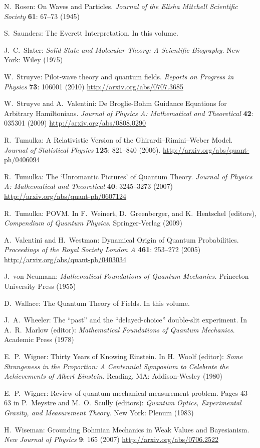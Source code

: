 \documentclass[12pt]{article}
\begin{document}
\begin{thebibliography}{20}
 N.~Rosen:
	On Waves and Particles. 
	\textit{Journal of the Elisha Mitchell Scientific Society} 
	\textbf{61}: 67--73 (1945)

 S.~Saunders: The Everett Interpretation.
	In this volume.

 J.~C.~Slater: 
	\textit{Solid-State and Molecular Theory: 
	A Scientific Biography.} 
	New York: Wiley (1975)

 W.~Struyve:  
	Pilot-wave theory and quantum fields.
	{\it Reports on Progress in Physics} {\bf 73}: 106001 (2010)
	 \url{http://arxiv.org/abs/0707.3685}

 W.~Struyve and A.~Valentini:
	De Broglie-Bohm Guidance Equations for Arbitrary Hamiltonians.
	\textit{Journal of Physics A: Mathematical and Theoretical} \textbf{42}: 035301 (2009) 
	\url{http://arxiv.org/abs/0808.0290}

 R.~Tumulka: 
	A Relativistic Version of the Ghirardi--Rimini--Weber Model. 
	\textit{Journal of Statistical Physics} 
	\textbf{125}: 821--840 (2006).
	\url{http://arxiv.org/abs/quant-ph/0406094}

 R.~Tumulka: 
	The `Unromantic Pictures' of Quantum Theory.
	\textit{Journal of Physics A: Mathematical and Theoretical} 
	\textbf{40}: 3245--3273 (2007)
	\url{http://arxiv.org/abs/quant-ph/0607124}

 R.~Tumulka:
	POVM.
	In F.~Weinert, D.~Greenberger, and K.~Hentschel 
	(editors), \textit{Compendium of Quantum Physics}.
	Springer-Verlag (2009)

 A.~Valentini and H.~Westman:
	Dynamical Origin of Quantum Probabilities.
	{\it Proceedings of the Royal Society London A} 
	{\bf 461}: 253--272 (2005)
	\url{http://arxiv.org/abs/quant-ph/0403034}

 J.~von Neumann:
	{\it Mathematical Foundations of Quantum Mechanics.}
	Princeton University Press (1955)

 D.~Wallace: The Quantum Theory of Fields.
	In this volume.

 J.~A.~Wheeler: 
	The ``past'' and the ``delayed-choice'' 
	double-slit experiment.
	In A.~R.~Marlow (editor): 
	{\it Mathematical Foundations of Quantum Mechanics}.
	Academic Press (1978)
	
 E.~P.~Wigner: 
	Thirty Years of Knowing Einstein.
	In H.~Woolf (editor): 
	\textit{Some Strangeness in the Proportion: 
	A Centennial Symposium
	to Celebrate the Achievements of Albert Einstein}.
	Reading, MA: Addison-Wesley (1980)

 E.~P.~Wigner:
	Review of quantum mechanical measurement problem.
	Pages 43--63 in P.~Meystre and M.~O.~Scully (editors):
	{\it Quantum Optics, Experimental Gravity, and 
	Measurement Theory.}
	New York: Plenum (1983)

 H.~Wiseman:
	Grounding Bohmian Mechanics in Weak Values and Bayesianism.
	{\it New Journal of Physics} {\bf 9}: 165 (2007)
	\url{http://arxiv.org/abs/0706.2522}

\end{thebibliography}
\end{document}
